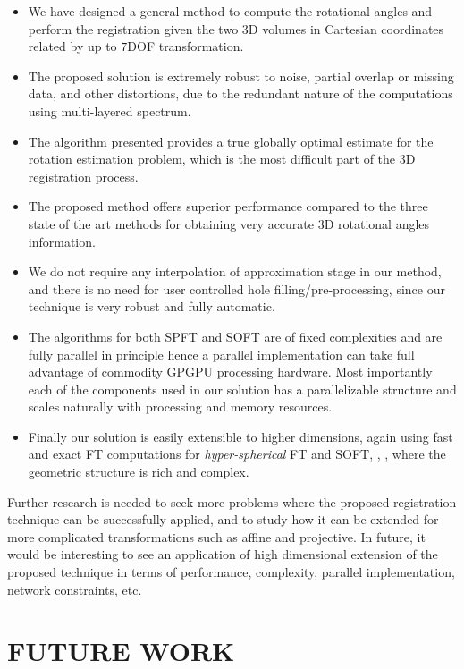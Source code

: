 \documentclass{UCF_ETD}
\begin{document}
\begin{itemize}
\item We have designed a general method to compute the rotational angles and perform the registration given the two $3$D volumes in Cartesian coordinates related by up to $7$DOF transformation.
\item The proposed solution is extremely robust to noise, partial overlap or missing data, and
other distortions, due to the redundant nature of the computations using multi-layered spectrum.
\item The algorithm presented provides a true globally optimal estimate for the rotation estimation problem, which is the most difficult part of the $3$D registration process. 
\item The proposed method offers superior performance compared to the three state of the art methods for obtaining very accurate $3$D rotational angles information. 
\item We do not require any interpolation of approximation stage in our method, and there is no need for user controlled hole filling/pre-processing, since our technique is very robust and fully automatic.
\item The algorithms for both SPFT and SOFT are of fixed complexities and are fully parallel in principle hence a parallel implementation can take full advantage of commodity GPGPU processing hardware. Most importantly each of the components used in our solution has a parallelizable structure and scales naturally with processing and memory resources.  
\item Finally our solution is easily extensible to higher dimensions, again using fast and exact  FT computations for \emph{hyper-spherical} FT and SOFT, \cite{Alam2015}, \cite{Kostelec2008},  where the geometric structure is rich and complex.
\end{itemize}

Further research is needed to seek more problems where the proposed registration technique can be successfully applied, and to study how it can be extended for more complicated transformations such as affine and projective. In future, it would be interesting to see an application of high dimensional extension of the proposed technique in terms of performance, complexity, parallel implementation, network constraints, etc. 



\chapter{FUTURE WORK} \label{FutureWork}
\end{document}
